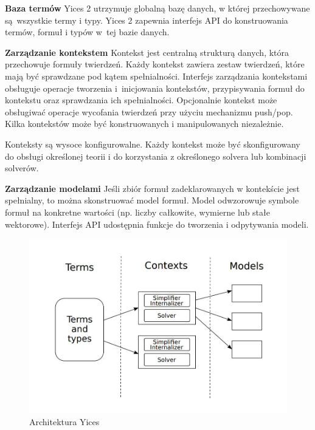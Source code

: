 \textbf{Baza termów} Yices 2 utrzymuje globalną bazę danych, w której przechowywane są~wszystkie termy i typy.
Yices 2 zapewnia interfejs API do konstruowania termów, formuł i typów w~tej bazie danych.

\textbf{Zarządzanie kontekstem} Kontekst jest centralną strukturą danych, która przechowuje formuły twierdzeń.
Każdy kontekst zawiera zestaw twierdzeń, które mają być sprawdzane pod kątem spełnialności. Interfejs zarządzania kontekstami obsługuje operacje tworzenia i~inicjowania kontekstów, przypisywania formuł do kontekstu oraz sprawdzania ich spełnialności. Opcjonalnie kontekst może obsługiwać operacje wycofania twierdzeń przy użyciu mechanizmu push/pop. Kilka kontekstów może być konstruowanych i manipulowanych niezależnie.

Konteksty są wysoce konfigurowalne. Każdy kontekst może być skonfigurowany do obsługi określonej teorii i do korzystania z określonego solvera lub kombinacji solverów.

\textbf{Zarządzanie modelami} Jeśli zbiór formuł zadeklarowanych w kontekście jest spełnialny, to można skonstruować model formuł. Model odwzorowuje symbole formuł na konkretne wartości (np. liczby całkowite, wymierne lub stałe wektorowe). Interfejs API udostępnia funkcje do tworzenia i odpytywania modeli.

\begin{figure}[htbp]
	\centering
	\begin{minipage}{\textwidth}
		\includegraphics[width=\textwidth]{./figures/yices_architecture}
		\caption{Architektura Yices}
		\label{fig:yices}
	\end{minipage}
\end{figure}

